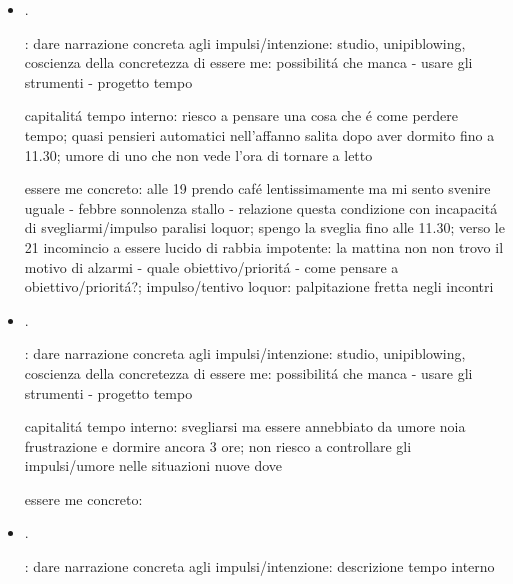 \begin{itemize}
essere me concreto: strano malessere dolore/palpitazione a sinistra dopo caf\'e dopo cena al pacinotti; il tempo per pensare o impulsi oggi ho cercato di pensare dalle 1 cercando cosa c'entrassero i test unilaterali, il tempo che passo pensando a come mi vedi te/ come sei te: saluto goffo mattina \'e un sintomo - insofferenza timore ''ragazzo fatto'' in aula cessi pacinotti; telefono genitori: hanno in comune la priorit\'a di fare altro; panico incontri, desiderio coazione passera: immagino incontro come specchio

\item {}.

: dare narrazione concreta agli impulsi/intenzione: studio, unipiblowing, coscienza della concretezza di essere me: possibilit\'a che manca - usare gli strumenti - progetto tempo 

capitalit\'a tempo interno: riesco a pensare una cosa che \'e come perdere tempo; quasi pensieri automatici nell'affanno salita dopo aver dormito fino a 11.30; umore di uno che non vede l'ora di tornare a letto

essere me concreto: alle 19 prendo caf\'e lentissimamente ma mi sento svenire uguale - febbre sonnolenza stallo - relazione questa condizione con incapacit\'a di svegliarmi/impulso paralisi loquor; spengo la sveglia fino alle 11.30; verso le 21 incomincio a essere lucido di rabbia impotente: la mattina non non trovo il motivo di alzarmi - quale obiettivo/priorit\'a - come pensare a obiettivo/priorit\'a?; impulso/tentivo loquor: palpitazione fretta negli incontri

\item {}.

: dare narrazione concreta agli impulsi/intenzione: studio, unipiblowing, coscienza della concretezza di essere me: possibilit\'a che manca - usare gli strumenti - progetto tempo

capitalit\'a tempo interno: svegliarsi ma essere annebbiato da umore noia frustrazione e dormire ancora 3 ore; non riesco a controllare gli impulsi/umore nelle situazioni nuove dove 

essere me concreto:

\item {}.

: dare narrazione concreta agli impulsi/intenzione: descrizione tempo interno


\end{itemize}
